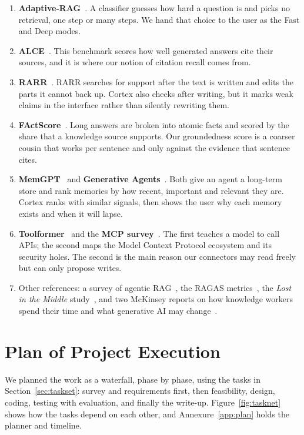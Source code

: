 \documentclass[oneside,a4paper,12pt]{report}
\begin{document}
\begin{enumerate}
\item \textbf{Adaptive-RAG}~\cite{jeong2024adaptiverag}. A classifier guesses how hard a question is and picks no retrieval, one step or many steps. We hand that choice to the user as the Fast and Deep modes.
\item \textbf{ALCE}~\cite{gao2023alce}. This benchmark scores how well generated answers cite their sources, and it is where our notion of citation recall comes from.
\item \textbf{RARR}~\cite{gao2023rarr}. RARR searches for support after the text is written and edits the parts it cannot back up. Cortex also checks after writing, but it marks weak claims in the interface rather than silently rewriting them.
\item \textbf{FActScore}~\cite{min2023factscore}. Long answers are broken into atomic facts and scored by the share that a knowledge source supports. Our groundedness score is a coarser cousin that works per sentence and only against the evidence that sentence cites.
\item \textbf{MemGPT}~\cite{packer2023memgpt} and \textbf{Generative Agents}~\cite{park2023generative}. Both give an agent a long-term store and rank memories by how recent, important and relevant they are. Cortex ranks with similar signals, then shows the user why each memory exists and when it will lapse.
\item \textbf{Toolformer}~\cite{schick2023toolformer} and the \textbf{MCP survey}~\cite{hou2025mcp}. The first teaches a model to call APIs; the second maps the Model Context Protocol ecosystem and its security holes. The second is the main reason our connectors may read freely but can only propose writes.
\item Other references: a survey of agentic RAG~\cite{singh2025agenticrag}, the RAGAS metrics~\cite{es2024ragas}, the \emph{Lost in the Middle} study~\cite{liu2024lost}, and two McKinsey reports on how knowledge workers spend their time and what generative AI may change~\cite{mckinseyweb,mckinsey}.
\end{enumerate}

\section{Plan of Project Execution}
We planned the work as a waterfall, phase by phase, using the tasks in Section~\ref{sec:taskset}: survey and requirements first, then feasibility, design, coding, testing with evaluation, and finally the write-up. Figure~\ref{fig:tasknet} shows how the tasks depend on each other, and Annexure~\ref{app:plan} holds the planner and timeline.
\end{document}
